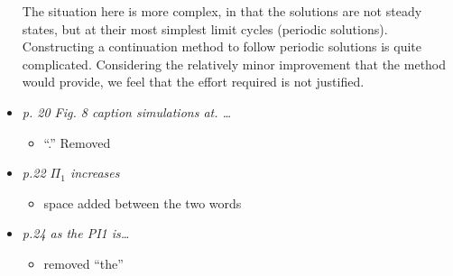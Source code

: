\documentclass[]{article}
\begin{document}
\begin{itemize}
The situation here is more complex, in that the solutions are not steady states, but at their most simplest limit cycles (periodic solutions). Constructing a continuation method to follow periodic solutions is quite complicated. Considering the relatively minor improvement that the method would provide, we feel that the effort required is not justified.


\item \emph{p.	20 Fig.	8	caption	simulations	at.	…}

\begin{itemize}
\item ``.'' Removed 
\end{itemize}

\item \emph{p.22	$\Pi_{1}$ increases}

\begin{itemize}
\item space added between the two words
\end{itemize}

\item \emph{p.24	as	the	PI1	is…}

\begin{itemize}
\item removed ``the''
\end{itemize}


\end{itemize}
\end{document}
